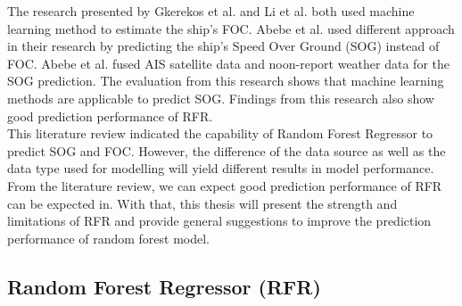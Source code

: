The research presented by Gkerekos et al. \cite{Gkerekos.2019} and Li et al. \cite{Li.2022} both used machine learning method to estimate the ship's FOC. Abebe et al. \cite{Abebe.2020} used different approach in their research by predicting the ship's Speed Over Ground (SOG) instead of FOC. Abebe et al. \cite{Abebe.2020} fused AIS satellite data and noon-report weather data for the SOG prediction. The evaluation from this research shows that machine learning methods are applicable to predict SOG. Findings from this research also show good prediction performance of RFR.\\

This literature review indicated the capability of Random Forest Regressor to predict SOG and FOC. However, the difference of the data source as well as the data type used for modelling will yield different results in model performance. From the literature review, we can expect good prediction performance of RFR can be expected in. With that, this thesis will present the strength and limitations of RFR and provide general suggestions to improve the prediction performance of random forest model.\\

\subsection{Random Forest Regressor (RFR)}\label{rfrtheo}


